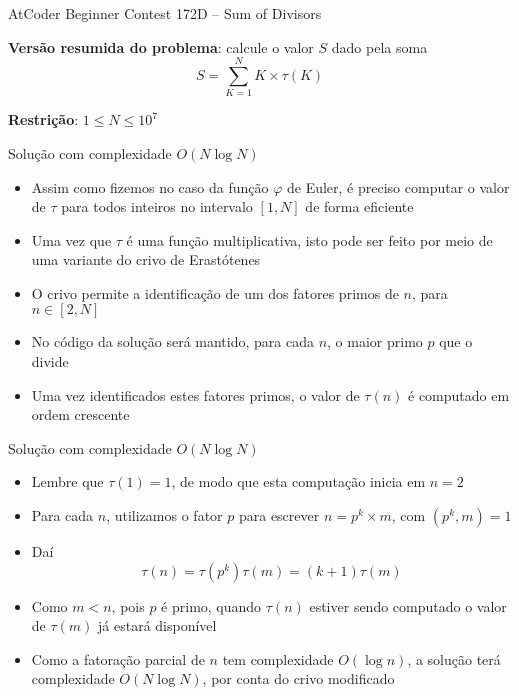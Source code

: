 \begin{frame}[fragile]{AtCoder Beginner Contest 172D -- Sum of Divisors}

    \textbf{Versão resumida do problema}: calcule o valor $S$ dado pela soma
    $$
        S = \sum_{K = 1}^N  K\times \tau(K)
    $$

    \vspace{0.1in}
    \textbf{Restrição}: $1 \leq N \leq 10^7$

\end{frame}

\begin{frame}[fragile]{Solução com complexidade $O(N\log N)$}

    \begin{itemize}
        \item Assim como fizemos no caso da função $\varphi$ de Euler, é preciso computar o valor
            de $\tau$ para todos inteiros no intervalo $[1, N]$ de forma eficiente

        \item Uma vez que $\tau$ é uma função multiplicativa, isto pode ser feito por meio de
            uma variante do crivo de Erastótenes

        \item O crivo permite a identificação de um dos fatores primos de $n$, para $n\in [2, N]$

        \item No código da solução será mantido, para cada $n$, o maior primo $p$ que o divide

        \item Uma vez identificados estes fatores primos, o valor de $\tau(n)$ é computado em
            ordem crescente
    \end{itemize}

\end{frame}

\begin{frame}[fragile]{Solução com complexidade $O(N\log N)$}

    \begin{itemize}
        \item Lembre que $\tau(1) = 1$, de modo que esta computação inicia em $n = 2$

        \item Para cada $n$, utilizamos o fator $p$ para escrever $n = p^k \times m$, com
            $(p^k, m) = 1$

        \item Daí $$\tau(n) = \tau(p^k)\tau(m) = (k + 1)\tau(m)$$

        \item Como $m < n$, pois $p$ é primo, quando $\tau(n)$ estiver sendo computado o valor de
            $\tau(m)$ já estará disponível

        \item Como a fatoração parcial de $n$ tem complexidade $O(\log n)$, a solução terá 
            complexidade $O(N\log N)$, por conta do crivo modificado
    \end{itemize}

\end{frame}

